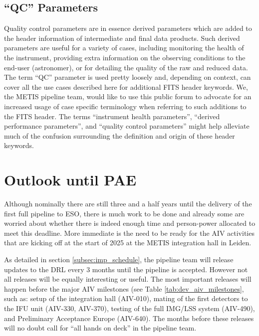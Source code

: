 \documentclass[a4paper]{spie}  %
\begin{document}
\subsection{``QC'' Parameters}

Quality control parameters are in essence derived parameters which are added to the header information of intermediate and final data products. 
Such derived parameters are useful for a variety of cases, including monitoring the health of the instrument, providing extra information on the observing conditions to the end-user (astronomer), or for detailing the quality of the raw and reduced data.
The term ``QC'' parameter is used pretty loosely and, depending on context, can cover all the use cases described here for additional FITS header keywords. 
We, the METIS pipeline team, would like to use this public forum to advocate for an increased usage of case specific terminology when referring to such additions to the FITS header. 
The terms ``instrument health parameters'', ``derived performance parameters'', and ``quality control parameters'' might help alleviate much of the confusion surrounding the definition and origin of these header keywords.


\section{Outlook until PAE}
\label{sec:outlook}

Although nominally there are still three and a half years until the delivery of the first full pipeline to ESO, there is much work to be done and already some are worried about whether there is indeed enough time and person-power allocated to meet this deadline. 
More immediate is the need to be ready for the AIV activities that are kicking off at the start of 2025 at the METIS integration hall in Leiden.

As detailed in section \ref{subsec:imp_schedule}, the pipeline team will release updates to the DRL every 3 months until the pipeline is accepted. 
However not all releases will be equally interesting or useful. 
The most important releases will happen before the major AIV milestones (see Table \ref{tab:dev_aiv_milestones}, such as: setup of the integration hall (AIV-010), mating of the first detectors to the IFU unit (AIV-330, AIV-370), testing of the full IMG/LSS system (AIV-490), and Preliminary Acceptance Europe (AIV-640).
The months before these releases will no doubt call for ``all hands on deck'' in the pipeline team.
\end{document}
